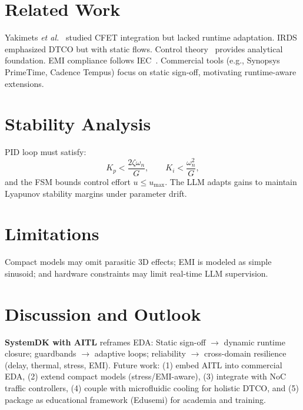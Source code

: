 \documentclass[conference]{IEEEtran}
\begin{document}
\section{Related Work}
Yakimets \emph{et al.}~\cite{yakimets2020} studied CFET integration but lacked runtime adaptation. IRDS~\cite{irds2023} emphasized DTCO but with static flows. Control theory~\cite{franklin2015,anderson2007,khalil2002} provides analytical foundation. EMI compliance follows IEC~\cite{iec2019}. Commercial tools (e.g., Synopsys PrimeTime, Cadence Tempus) focus on static sign-off, motivating runtime-aware extensions.

\section{Stability Analysis}
PID loop must satisfy:
\begin{equation}
K_p<\frac{2\zeta\omega_n}{G},\qquad K_i<\frac{\omega_n^2}{G},
\end{equation}
and the FSM bounds control effort $u\le u_{\max}$. The LLM adapts gains to maintain Lyapunov stability margins under parameter drift.

\section{Limitations}
Compact models may omit parasitic 3D effects; EMI is modeled as simple sinusoid; and hardware constraints may limit real-time LLM supervision.

\section{Discussion and Outlook}
\textbf{SystemDK with AITL} reframes EDA:
Static sign-off $\rightarrow$ dynamic runtime closure;
guardbands $\rightarrow$ adaptive loops;
reliability $\rightarrow$ cross-domain resilience (delay, thermal, stress, EMI).
Future work: (1) embed AITL into commercial EDA, (2) extend compact models (stress/EMI-aware), (3) integrate with NoC traffic controllers, (4) couple with microfluidic cooling for holistic DTCO, and (5) package as educational framework (Edusemi) for academia and training.
\end{document}
